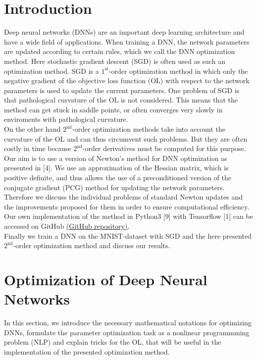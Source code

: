 \documentclass[conference]{IEEEtran}
\begin{document}
\section{Introduction} 
\noindent
Deep neural networks (DNNs) are an important deep learning architecture and have a wide field of applications. When training a DNN, the network parameters are updated according to certain rules, which we call the DNN optimization method. Here stochastic gradient descent (SGD) is often used as such an optimization method. SGD is a $1^{\text{st}}$-order optimization method in which only the negative gradient of the objective loss function (OL) with respect to the network parameters is used to update the current parameters. One problem of SGD is that pathological curvature of the OL is not considered. This means that the method can get stuck in saddle points, or often converges very slowly in enviroments with pathological curvature.\\
On the other hand $2^{\text{nd}}$-order optimization methods take into account the curvature of the OL and can thus circumvent such problems. But they are often costly in time because $2^{\text{nd}}$-order derivatives must be computed for this purpose.\\
Our aim is to use a version of Newton's method for DNN optimization as presented in [4]. We use an approximation of the Hessian matrix, which is positive definite, and thus allows the use of a preconditioned version of the conjugate gradient (PCG) method for updating the network parameters. Therefore we discuss the individual problems of standard Newton updates and the improvements proposed for them in order to ensure computational efficiency. Our own implementation of the method in Python3 [9] with Tensorflow [1] can be accessed on GitHub \href{https://github.com/NiklasBrunn/Hessian_Free_Optimization_of_Deep_Neural_Networks}{(GitHub repository)}.\\ 
Finally we train a DNN on the MNIST-dataset with SGD and the here presented $2^{\text{nd}}$-order optimization method and discuss our results.


\section{Optimization of Deep Neural Networks}
\noindent
In this section, we introduce the necessary mathematical notations for optimizing DNNs, formulate the parameter optimization task as a nonlinear programmming problem (NLP) and explain tricks for the OL, that will be useful in the implementation of the presented optimization method.
\end{document}
